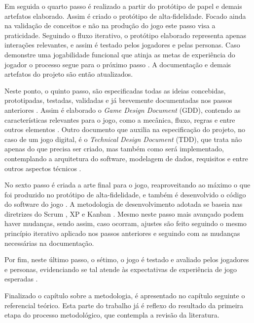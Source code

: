 Em seguida o quarto passo é realizado a partir do protótipo de papel e demais artefatos elaborado. Assim é criado o protótipo de alta-fidelidade. Focado ainda na validação de conceitos e não na produção do jogo este passo visa a praticidade. Seguindo o fluxo iterativo, o protótipo elaborado representa apenas interações relevantes, e assim é testado pelos jogadores e pelas personas. Caso demonstre uma jogabilidade funcional que atinja as metas de experiência do jogador o processo segue para o próximo passo \cite[p. 15]{Fullerton_2008}. A documentação e demais artefatos do projeto são então atualizados. 

Neste ponto, o quinto passo, são especificadas todas as ideias concebidas, prototipadas, testadas, validadas e já brevemente documentadas nos passos anteriores \cite[p. 15]{Fullerton_2008}. Assim é elaborado o \textit{Game Design Document} (GDD), contendo as características relevantes para o jogo, como a mecânica, fluxo, regras e entre outros elementos \cite[p. 101]{Bethke_2003}. Outro documento que auxilia na especificação do projeto, no caso de um jogo digital, é o \textit{Technical Design Document} (TDD), que trata não apenas do que precisa ser criado, mas também como será implementado, contemplando a arquitetura do software, modelagem de dados, requisitos e entre outros aspectos técnicos \cite[p. 129]{Bethke_2003}.

No sexto passo é criada a arte final para o jogo, reaproveitando ao máximo o que foi produzido no protótipo de alta-fidelidade, e também é desenvolvido o código do software do jogo \cite[p. 15, 18]{Fullerton_2008}. A metodologia de desenvolvimento adotada se baseia nas diretrizes do Scrum \cite{schwaber2002agile}, XP \cite{lindstrom2004extreme} e Kanban \cite{kniberg2010kanban}. Mesmo neste passo mais avançado podem haver mudanças, sendo assim, caso ocorram, ajustes são feito seguindo o mesmo princípio iterativo aplicado nos passos anteriores e seguindo com as mudanças necessárias na documentação. 
    
Por fim, neste último passo, o sétimo, o jogo é testado e avaliado pelos jogadores e personas, evidenciando se tal atende às expectativas de experiência de jogo esperadas \cite[p. 18]{Fullerton_2008}. %

Finalizado o capítulo sobre a metodologia, é apresentado no capítulo seguinte o referencial teórico. Esta parte do trabalho já é reflexo do resultado da primeira etapa do processo metodológico, que contempla a revisão da literatura.


